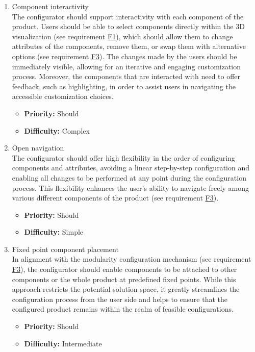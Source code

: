 \begin{enumerate}[label=\textbf{F\arabic*:}, leftmargin=*]
\item \label{itm:F4} Component interactivity
\vspace{2pt}
\\The configurator should support interactivity with each component of the product. Users should be able to select components directly within the 3D visualization (see requirement \hyperref[itm:F1]{F1}), which should allow them to change attributes of the components, remove them, or swap them with alternative options (see requirement \hyperref[itm:F3]{F3}). The changes made by the users should be immediately visible, allowing for an iterative and engaging customization process. Moreover, the components that are interacted with need to offer feedback, such as highlighting, in order to assist users in navigating the accessible customization choices.
\begin{itemize}[noitemsep, label=\trianglebullet]
    \item \textbf{Priority:} Should
    \item \textbf{Difficulty:} Complex
\end{itemize}
\vspace{4pt}

\item \label{itm:F5} Open navigation
\vspace{2pt}
\\The configurator should offer high flexibility in the order of configuring components and attributes, avoiding a linear step-by-step configuration and enabling all changes to be performed at any point during the configuration process. This flexibility enhances the user's ability to navigate freely among various different components of the product (see requirement \hyperref[itm:F3]{F3}).
\begin{itemize}[noitemsep, label=\trianglebullet]
    \item \textbf{Priority:} Should
    \item \textbf{Difficulty:} Simple
\end{itemize}
\vspace{4pt}

\item \label{itm:F6} Fixed point component placement
\vspace{2pt}
\\In alignment with the modularity configuration mechanism (see requirement \hyperref[itm:F3]{F3}), the configurator should enable components to be attached to other components or the whole product at predefined fixed points. While this approach restricts the potential solution space, it greatly streamlines the configuration process from the user side and helps to ensure that the configured product remains within the realm of feasible configurations.
\begin{itemize}[noitemsep, label=\trianglebullet]
    \item \textbf{Priority:} Should
    \item \textbf{Difficulty:} Intermediate
\end{itemize}
\vspace{4pt}


\end{enumerate}
